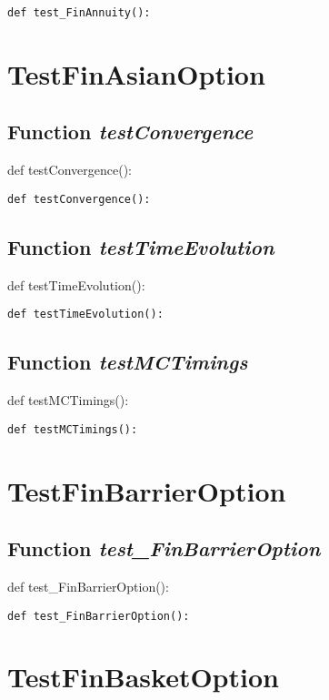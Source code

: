 \documentclass[twoside,11pt]{book}
\begin{document}
\begin{lstlisting}
def test_FinAnnuity():
\end{lstlisting}


\newpage
\section{TestFinAsianOption}

\subsection{Function {\it testConvergence}}
def testConvergence():

\begin{lstlisting}
def testConvergence():
\end{lstlisting}

\subsection{Function {\it testTimeEvolution}}
def testTimeEvolution():

\begin{lstlisting}
def testTimeEvolution():
\end{lstlisting}

\subsection{Function {\it testMCTimings}}
def testMCTimings():

\begin{lstlisting}
def testMCTimings():
\end{lstlisting}


\newpage
\section{TestFinBarrierOption}

\subsection{Function {\it test\_FinBarrierOption}}
def test\_FinBarrierOption():

\begin{lstlisting}
def test_FinBarrierOption():
\end{lstlisting}


\newpage
\section{TestFinBasketOption}
\end{document}

